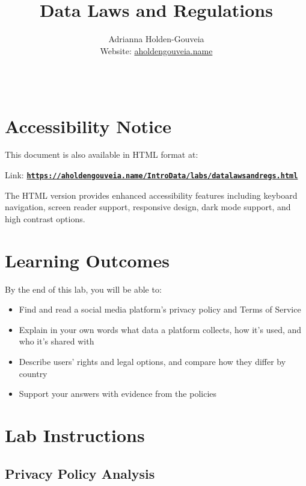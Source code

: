 \documentclass[12pt]{article}
\title{Data Laws and Regulations}
\author{
        Adrianna Holden-Gouveia \\
        Website: \href{https://aholdengouveia.name}{aholdengouveia.name}\\ 
        \date{\vspace{-5ex}}
        \faGithub {: aholdengouveia} \\
        }
\begin{document}
    

\maketitle



\section*{Accessibility Notice}
This document is also available in HTML format at:

Link: \href{https://aholdengouveia.name/IntroData/labs/datalawsandregs.html}{\textbf{\nolinkurl{https://aholdengouveia.name/IntroData/labs/datalawsandregs.html}}}

The HTML version provides enhanced accessibility features including keyboard navigation, screen reader support, responsive design, dark mode support, and high contrast options.

\section*{Learning Outcomes}
By the end of this lab, you will be able to:
\begin{itemize}
    \item Find and read a social media platform's privacy policy and Terms of Service
    \item Explain in your own words what data a platform collects, how it's used, and who it's shared with
    \item Describe users' rights and legal options, and compare how they differ by country
    \item Support your answers with evidence from the policies
\end{itemize}

\section*{Lab Instructions}


\subsection*{Privacy Policy Analysis}
\end{document}
